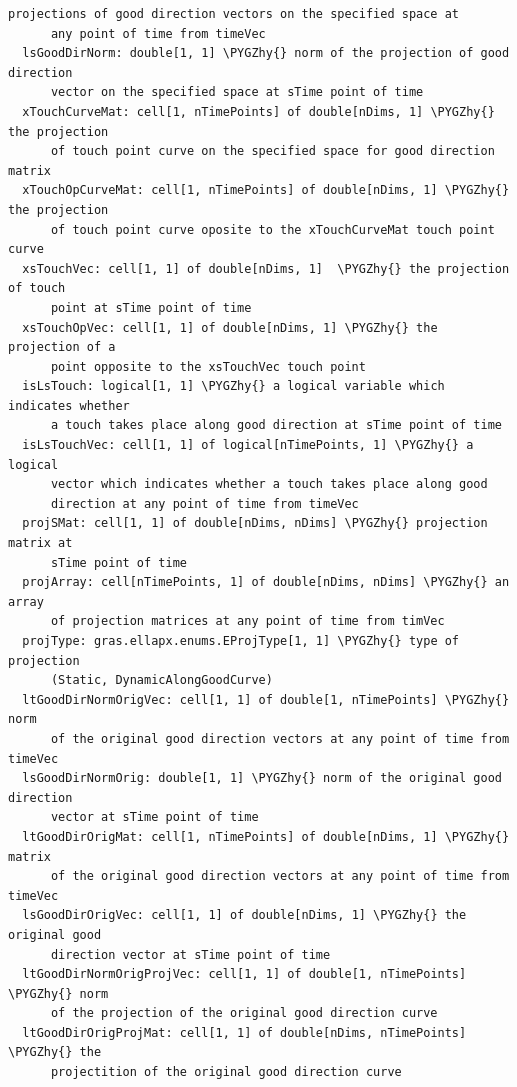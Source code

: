 \documentclass[letterpaper,10pt,english]{sphinxmanual}
\def\PYGZhy{\char`\-}
\begin{document}
\begin{Verbatim}[commandchars=\\\{\}]
      projections of good direction vectors on the specified space at
      any point of time from timeVec
  lsGoodDirNorm: double[1, 1] \PYGZhy{} norm of the projection of good direction
      vector on the specified space at sTime point of time
  xTouchCurveMat: cell[1, nTimePoints] of double[nDims, 1] \PYGZhy{} the projection
      of touch point curve on the specified space for good direction matrix
  xTouchOpCurveMat: cell[1, nTimePoints] of double[nDims, 1] \PYGZhy{} the projection
      of touch point curve oposite to the xTouchCurveMat touch point curve
  xsTouchVec: cell[1, 1] of double[nDims, 1]  \PYGZhy{} the projection of touch
      point at sTime point of time
  xsTouchOpVec: cell[1, 1] of double[nDims, 1] \PYGZhy{} the projection of a
      point opposite to the xsTouchVec touch point
  isLsTouch: logical[1, 1] \PYGZhy{} a logical variable which indicates whether
      a touch takes place along good direction at sTime point of time
  isLsTouchVec: cell[1, 1] of logical[nTimePoints, 1] \PYGZhy{} a logical
      vector which indicates whether a touch takes place along good
      direction at any point of time from timeVec
  projSMat: cell[1, 1] of double[nDims, nDims] \PYGZhy{} projection matrix at
      sTime point of time
  projArray: cell[nTimePoints, 1] of double[nDims, nDims] \PYGZhy{} an array
      of projection matrices at any point of time from timVec
  projType: gras.ellapx.enums.EProjType[1, 1] \PYGZhy{} type of projection
      (Static, DynamicAlongGoodCurve)
  ltGoodDirNormOrigVec: cell[1, 1] of double[1, nTimePoints] \PYGZhy{} norm
      of the original good direction vectors at any point of time from timeVec
  lsGoodDirNormOrig: double[1, 1] \PYGZhy{} norm of the original good direction
      vector at sTime point of time
  ltGoodDirOrigMat: cell[1, nTimePoints] of double[nDims, 1] \PYGZhy{} matrix
      of the original good direction vectors at any point of time from timeVec
  lsGoodDirOrigVec: cell[1, 1] of double[nDims, 1] \PYGZhy{} the original good
      direction vector at sTime point of time
  ltGoodDirNormOrigProjVec: cell[1, 1] of double[1, nTimePoints] \PYGZhy{} norm
      of the projection of the original good direction curve
  ltGoodDirOrigProjMat: cell[1, 1] of double[nDims, nTimePoints] \PYGZhy{} the
      projectition of the original good direction curve
\end{Verbatim}
\end{document}
